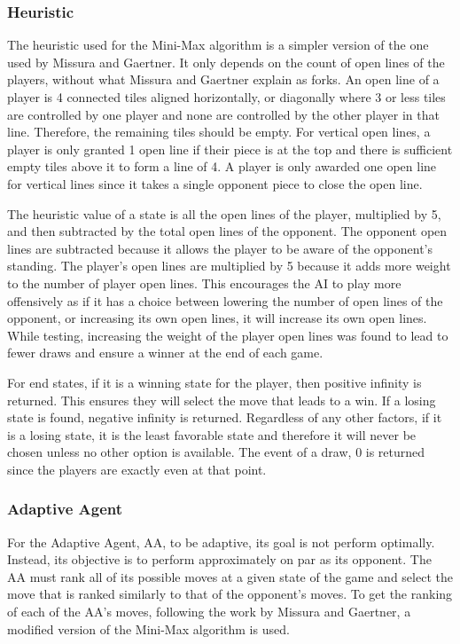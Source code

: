 \documentclass[12pt]{article}
\begin{document}
\subsubsection*{Heuristic}
The heuristic used for the Mini-Max algorithm is a simpler version of the one used by Missura and Gaertner. It only depends on the count of open lines of the players, without what Missura and Gaertner explain as forks. An open line of a player is 4 connected tiles aligned horizontally, or diagonally where 3 or less tiles are controlled by one player and none are controlled by the other player in that line. Therefore, the remaining tiles should be empty. For vertical open lines, a player is only granted 1 open line if their piece is at the top and there is sufficient empty tiles above it to form a line of 4. A player is only awarded one open line for vertical lines since it takes a single opponent piece to close the open line.

The heuristic value of a state is all the open lines of the player, multiplied by 5, and then subtracted by the total open lines of the opponent. The opponent open lines are subtracted because it allows the player to be aware of the opponent's standing. The player's open lines are multiplied by 5 because it adds more weight to the number of player open lines. This encourages the AI to play more offensively as if it has a choice between lowering the number of open lines of the opponent, or increasing its own open lines, it will increase its own open lines. While testing, increasing the weight of the player open lines was found to lead to fewer draws and ensure a winner at the end of each game.

For end states, if it is a winning state for the player, then positive infinity is returned. This ensures they will select the move that leads to a win. If a losing state is found, negative infinity is returned. Regardless of any other factors, if it is a losing state, it is the least favorable state and therefore it will never be chosen unless no other option is available. The event of a draw, 0 is returned since the players are exactly even at that point.


\subsubsection*{Adaptive Agent}
For the Adaptive Agent, AA, to be adaptive, its goal is not perform optimally. Instead, its objective is to perform approximately on par as its opponent. The AA must rank all of its possible moves at a given state of the game and select the move that is ranked similarly to that of the opponent's moves. To get the ranking of each of the AA's moves, following the work by Missura and Gaertner, a modified version of the Mini-Max algorithm is used.
\end{document}
